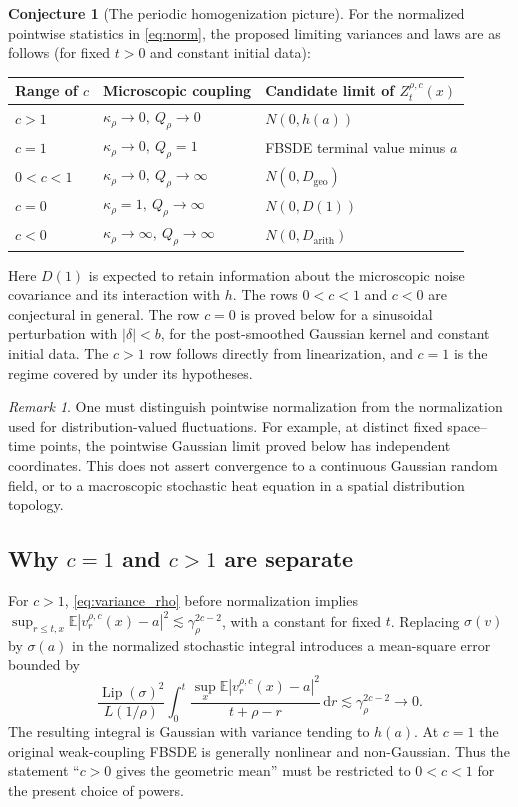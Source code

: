 \documentclass[11pt]{article}
\numberwithin{equation}{section}
\theoremstyle{definition}
\newtheorem{conjecture}[theorem]{Conjecture}
\theoremstyle{remark}
\newtheorem{remark}[theorem]{Remark}
\newcommand{\E}{\mathbb E}
\newcommand{\dd}{\,\mathrm d}
\newcommand{\Lip}{\operatorname{Lip}}
\newcommand{\Geo}{D_{\mathrm{geo}}}
\newcommand{\Arith}{D_{\mathrm{arith}}}
\begin{document}
\begin{conjecture}[The periodic homogenization picture]\label{conj:main}
For the normalized pointwise statistics in \eqref{eq:norm}, the proposed limiting variances and laws are as follows (for fixed $t>0$ and constant initial data):
\begin{center}
\begin{tabular}{@{}lll@{}}
\toprule
Range of $c$ & Microscopic coupling & Candidate limit of $Z_t^{\rho,c}(x)$\\
\midrule
$c>1$ & $\kappa_\rho\to0,\ Q_\rho\to0$ & $N(0,h(a))$\\
$c=1$ & $\kappa_\rho\to0,\ Q_\rho=1$ & FBSDE terminal value minus $a$\\
$0<c<1$ & $\kappa_\rho\to0,\ Q_\rho\to\infty$ & $N(0,\Geo)$\\
$c=0$ & $\kappa_\rho=1,\ Q_\rho\to\infty$ & $N(0,D(1))$\\
$c<0$ & $\kappa_\rho\to\infty,\ Q_\rho\to\infty$ & $N(0,\Arith)$\\
\bottomrule
\end{tabular}
\end{center}
Here $D(1)$ is expected to retain information about the microscopic noise covariance and its interaction with $h$. The rows $0<c<1$ and $c<0$ are conjectural in general. The row $c=0$ is proved below for a sinusoidal perturbation with $|\delta|<b$, for the post-smoothed Gaussian kernel and constant initial data. The $c>1$ row follows directly from linearization, and $c=1$ is the regime covered by \cite{DG} under its hypotheses.
\end{conjecture}
\begin{remark}
One must distinguish pointwise normalization from the normalization used for distribution-valued fluctuations. For example, at distinct fixed space--time points, the pointwise Gaussian limit proved below has independent coordinates. This does not assert convergence to a continuous Gaussian random field, or to a macroscopic stochastic heat equation in a spatial distribution topology.
\end{remark}

\subsection{Why $c=1$ and $c>1$ are separate}
For $c>1$, \eqref{eq:variance_rho} before normalization implies $\sup_{r\le t,x}\E|v_r^{\rho,c}(x)-a|^2\lesssim \gamma_\rho^{2c-2}$, with a constant for fixed $t$. Replacing $\sigma(v)$ by $\sigma(a)$ in the normalized stochastic integral introduces a mean-square error bounded by
\[
 \frac{\Lip(\sigma)^2}{L(1/\rho)}\int_0^t
 \frac{\sup_x\E|v_r^{\rho,c}(x)-a|^2}{t+\rho-r}\dd r
 \lesssim \gamma_\rho^{2c-2}\longrightarrow0.
\]
The resulting integral is Gaussian with variance tending to $h(a)$. At $c=1$ the original weak-coupling FBSDE is generally nonlinear and non-Gaussian. Thus the statement ``$c>0$ gives the geometric mean'' must be restricted to $0<c<1$ for the present choice of powers.
\end{document}
